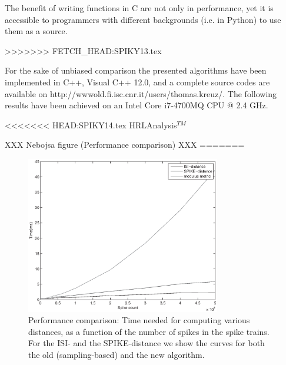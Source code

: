\documentclass[10pt,twocolumn]{elsart5p}
\begin{document}
The benefit of writing functions in C are not only in performance, yet it is accessible to programmers with different backgrounds (i.e. in Python) to use them as a source.

>>>>>>> FETCH_HEAD:SPIKY13.tex



For the sake of unbiased comparison the presented algorithms have been implemented in C++, Visual C++ 12.0, and a complete source codes are available on http://wwwold.fi.isc.cnr.it/users/thomas.kreuz/. The following results have been achieved on an Intel Core i7-4700MQ CPU @ 2.4 GHz.

<<<<<<< HEAD:SPIKY14.tex
HRLAnalysis$^{TM}$ \citep{Thibeault14}

XXX Nebojsa figure (Performance comparison) XXX
%
=======
\begin{figure}
    \includegraphics[width=85mm]{Fig5_Performance_Comparison.eps}
    \caption{\abb\label{fig:Fig5-Performance-Comparison} Performance comparison: Time needed for computing various distances, as a function of the number of spikes in the spike trains. For the ISI- and the SPIKE-distance we show the curves for both the old (sampling-based) and the new algorithm.}
\end{figure}
\end{document}
